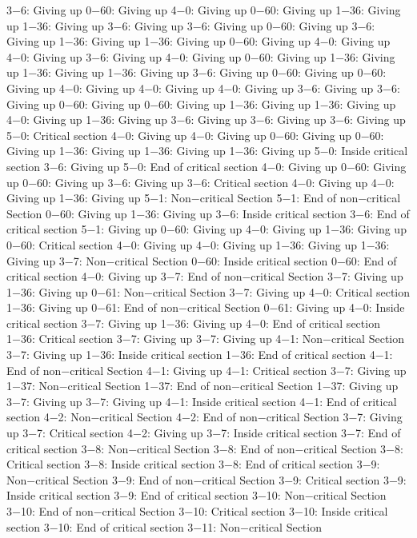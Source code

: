 3−6: Giving up
0−60: Giving up
4−0: Giving up
0−60: Giving up
1−36: Giving up
1−36: Giving up
3−6: Giving up
3−6: Giving up
0−60: Giving up
3−6: Giving up
1−36: Giving up
1−36: Giving up
0−60: Giving up
4−0: Giving up
4−0: Giving up
3−6: Giving up
4−0: Giving up
0−60: Giving up
1−36: Giving up
1−36: Giving up
1−36: Giving up
3−6: Giving up
0−60: Giving up
0−60: Giving up
4−0: Giving up
4−0: Giving up
4−0: Giving up
3−6: Giving up
3−6: Giving up
0−60: Giving up
0−60: Giving up
1−36: Giving up
1−36: Giving up
4−0: Giving up
1−36: Giving up
3−6: Giving up
3−6: Giving up
3−6: Giving up
5−0: Critical section
4−0: Giving up
4−0: Giving up
0−60: Giving up
0−60: Giving up
1−36: Giving up
1−36: Giving up
1−36: Giving up
5−0: Inside critical section
3−6: Giving up
5−0: End of critical section
4−0: Giving up
0−60: Giving up
0−60: Giving up
3−6: Giving up
3−6: Critical section
4−0: Giving up
4−0: Giving up
1−36: Giving up
5−1: Non−critical Section
5−1: End of non−critical Section
0−60: Giving up
1−36: Giving up
3−6: Inside critical section
3−6: End of critical section
5−1: Giving up
0−60: Giving up
4−0: Giving up
1−36: Giving up
0−60: Critical section
4−0: Giving up
4−0: Giving up
1−36: Giving up
1−36: Giving up
3−7: Non−critical Section
0−60: Inside critical section
0−60: End of critical section
4−0: Giving up
3−7: End of non−critical Section
3−7: Giving up
1−36: Giving up
0−61: Non−critical Section
3−7: Giving up
4−0: Critical section
1−36: Giving up
0−61: End of non−critical Section
0−61: Giving up
4−0: Inside critical section
3−7: Giving up
1−36: Giving up
4−0: End of critical section
1−36: Critical section
3−7: Giving up
3−7: Giving up
4−1: Non−critical Section
3−7: Giving up
1−36: Inside critical section
1−36: End of critical section
4−1: End of non−critical Section
4−1: Giving up
4−1: Critical section
3−7: Giving up
1−37: Non−critical Section
1−37: End of non−critical Section
1−37: Giving up
3−7: Giving up
3−7: Giving up
4−1: Inside critical section
4−1: End of critical section
4−2: Non−critical Section
4−2: End of non−critical Section
3−7: Giving up
3−7: Critical section
4−2: Giving up
3−7: Inside critical section
3−7: End of critical section
3−8: Non−critical Section
3−8: End of non−critical Section
3−8: Critical section
3−8: Inside critical section
3−8: End of critical section
3−9: Non−critical Section
3−9: End of non−critical Section
3−9: Critical section
3−9: Inside critical section
3−9: End of critical section
3−10: Non−critical Section
3−10: End of non−critical Section
3−10: Critical section
3−10: Inside critical section
3−10: End of critical section
3−11: Non−critical Section
